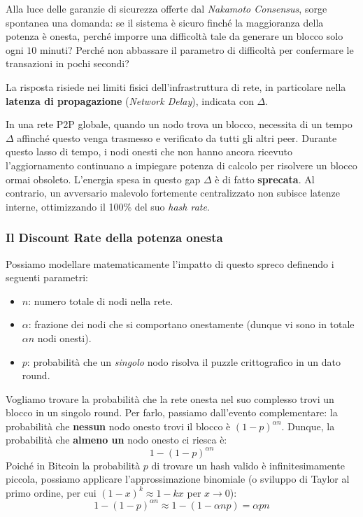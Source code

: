 Alla luce delle garanzie di sicurezza offerte dal \textit{Nakamoto Consensus}, sorge spontanea una domanda: se il sistema è sicuro finché la maggioranza della potenza è onesta, perché imporre una difficoltà tale da generare un blocco solo ogni $10$ minuti? Perché non abbassare il parametro di difficoltà per confermare le transazioni in pochi secondi?

La risposta risiede nei limiti fisici dell'infrastruttura di rete, in particolare nella \textbf{latenza di propagazione} (\textit{Network Delay}), indicata con $\Delta$.

In una rete P2P globale, quando un nodo trova un blocco, necessita di un tempo $\Delta$ affinché questo venga trasmesso e verificato da tutti gli altri peer. Durante questo lasso di tempo, i nodi onesti che non hanno ancora ricevuto l'aggiornamento continuano a impiegare potenza di calcolo per risolvere un blocco ormai obsoleto. L'energia spesa in questo gap $\Delta$ è di fatto \textbf{sprecata}. Al contrario, un avversario malevolo fortemente centralizzato non subisce latenze interne, ottimizzando il 100\% del suo \textit{hash rate}.

\subsubsection{Il Discount Rate della potenza onesta}
Possiamo modellare matematicamente l'impatto di questo spreco definendo i seguenti parametri:
\begin{itemize}
    \item $n$: numero totale di nodi nella rete.
    \item $\alpha$: frazione dei nodi che si comportano onestamente (dunque vi sono in totale $\alpha n$ nodi onesti).
    \item $p$: probabilità che un \textit{singolo} nodo risolva il puzzle crittografico in un dato round.
\end{itemize}

Vogliamo trovare la probabilità che la rete onesta nel suo complesso trovi un blocco in un singolo round. Per farlo, passiamo dall'evento complementare: la probabilità che \textbf{nessun} nodo onesto trovi il blocco è $(1-p)^{\alpha n}$. 
Dunque, la probabilità che \textbf{almeno un} nodo onesto ci riesca è:
$$ 1 - (1-p)^{\alpha n} $$
Poiché in Bitcoin la probabilità $p$ di trovare un hash valido è infinitesimamente piccola, possiamo applicare l'approssimazione binomiale (o sviluppo di Taylor al primo ordine, per cui $(1-x)^k \approx 1 - kx$ per $x \to 0$):
$$ 1 - (1-p)^{\alpha n} \approx 1 - (1 - \alpha n p) = \alpha p n $$

